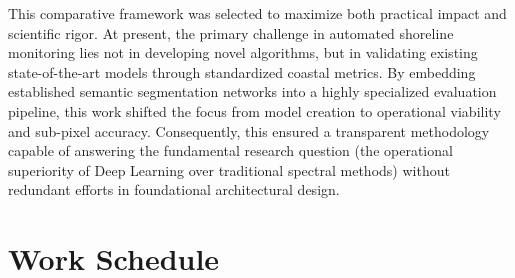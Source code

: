 ﻿\documentclass[ENG]{TFUOC}%
\begin{document}
This comparative framework was selected to maximize both practical impact and scientific rigor. At present, the primary challenge in automated shoreline monitoring lies not in developing novel algorithms, but in validating existing state-of-the-art models through standardized coastal metrics. By embedding established semantic segmentation networks into a highly specialized evaluation pipeline, this work shifted the focus from model creation to operational viability and sub-pixel accuracy. Consequently, this ensured a transparent methodology capable of answering the fundamental research question (the operational superiority of Deep Learning over traditional spectral methods) without redundant efforts in foundational architectural design.

\section{Work Schedule}
\end{document}
